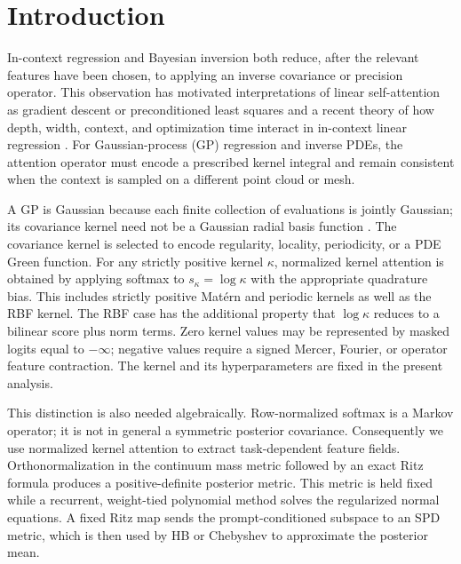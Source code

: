 \documentclass[11pt,a4paper]{article}
\numberwithin{equation}{section}
\theoremstyle{definition}
\theoremstyle{remark}
\begin{document}
\section{Introduction}

In-context regression and Bayesian inversion both reduce, after the relevant
features have been chosen, to applying an inverse covariance or precision
operator.  This observation has motivated interpretations of linear
self-attention as gradient descent or preconditioned least squares
\citep{vonoswald2023transformers,akyurek2023learning,garg2022what} and a recent
theory of how depth, width, context, and optimization time interact in
in-context linear regression \citep{bordelon2026scaling}. For
Gaussian-process (GP) regression and inverse PDEs, the attention operator must
encode a prescribed kernel integral and remain consistent when the context is
sampled on a different point cloud or mesh.

A GP is Gaussian because each
finite collection of evaluations is jointly Gaussian; its covariance kernel
need not be a Gaussian radial basis function \citep{rasmussen2006gaussian}.
The covariance kernel is selected to encode regularity, locality, periodicity,
or a PDE Green function. For any strictly positive kernel \(\kappa\),
normalized kernel attention is obtained by applying softmax to
\(s_\kappa=\log\kappa\) with the appropriate quadrature bias. This includes
strictly positive Mat\'ern and periodic kernels as well as the RBF kernel.
The RBF case has the additional property that \(\log\kappa\) reduces to a
bilinear score plus norm terms. Zero kernel values may be represented by
masked logits equal to \(-\infty\); negative values require a signed Mercer,
Fourier, or operator feature contraction. The kernel and its hyperparameters
are fixed in the present analysis.

This distinction is also needed algebraically.  Row-normalized softmax is a
Markov operator; it is not in general a symmetric posterior covariance.
Consequently we use normalized kernel attention to extract task-dependent
feature fields.  Orthonormalization in the continuum mass metric followed by
an exact Ritz formula produces a positive-definite posterior metric.  This
metric is held fixed while a recurrent, weight-tied polynomial method solves
the regularized normal equations. A fixed Ritz map sends the
prompt-conditioned subspace to an SPD metric, which is then used by HB or
Chebyshev to approximate the posterior mean.
\end{document}

